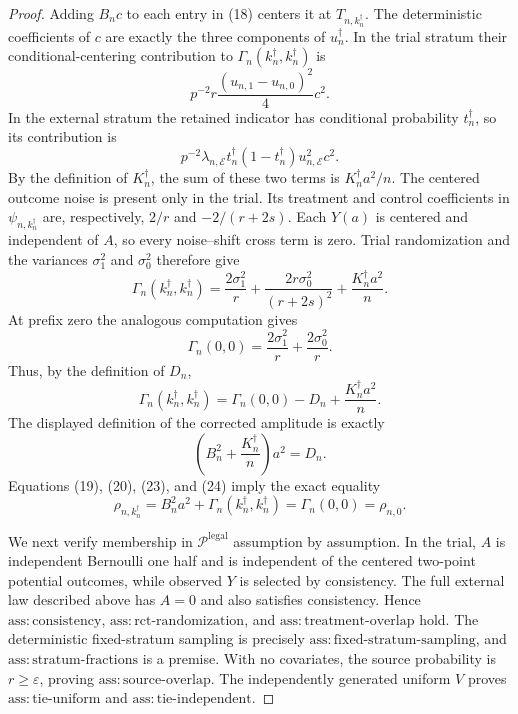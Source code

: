 \documentclass{article}
\begin{document}
\begin{proof}
Adding \(B_nc\) to each entry in (18) centers it at \(T_{n,k_n^{\dagger}}\).  The deterministic coefficients of \(c\) are exactly the three components of \(u_n^{\dagger}\).  In the trial stratum their conditional-centering contribution to \(\Gamma_n(k_n^{\dagger},k_n^{\dagger})\) is
\[
 p^{-2}r\frac{(u_{n,1}-u_{n,0})^2}{4}c^2.
\]
In the external stratum the retained indicator has conditional probability \(t_n^{\dagger}\), so its contribution is
\[
 p^{-2}\lambda_{n,\mathcal E}t_n^{\dagger}(1-t_n^{\dagger})u_{n,\mathcal E}^2c^2.
\]
By the definition of \(K_n^{\dagger}\), the sum of these two terms is \(K_n^{\dagger}a^2/n\).  The centered outcome noise is present only in the trial.  Its treatment and control coefficients in \(\psi_{n,k_n^{\dagger}}\) are, respectively, \(2/r\) and \(-2/(r+2s)\).  Each \(Y(a)\) is centered and independent of \(A\), so every noise--shift cross term is zero.  Trial randomization and the variances \(\sigma_1^2\) and \(\sigma_0^2\) therefore give
\[
 \Gamma_n(k_n^{\dagger},k_n^{\dagger})
 =\frac{2\sigma_1^2}{r}
  +\frac{2r\sigma_0^2}{(r+2s)^2}
  +\frac{K_n^{\dagger}a^2}{n}.
\tag{21}
\]
At prefix zero the analogous computation gives
\[
 \Gamma_n(0,0)=\frac{2\sigma_1^2}{r}+\frac{2\sigma_0^2}{r}.
\tag{22}
\]
Thus, by the definition of \(D_n\),
\[
 \Gamma_n(k_n^{\dagger},k_n^{\dagger})
 =\Gamma_n(0,0)-D_n+\frac{K_n^{\dagger}a^2}{n}.
\tag{23}
\]
The displayed definition of the corrected amplitude is exactly
\[
 \left(B_n^2+\frac{K_n^{\dagger}}n\right)a^2=D_n.
\tag{24}
\]
Equations (19), (20), (23), and (24) imply the exact equality
\[
 \rho_{n,k_n^{\dagger}}
 =B_n^2a^2+\Gamma_n(k_n^{\dagger},k_n^{\dagger})
 =\Gamma_n(0,0)
 =\rho_{n,0}.
\tag{25}
\]

We next verify membership in \(\mathcal P^{\mathrm{legal}}\) assumption by assumption.  In the trial, \(A\) is independent Bernoulli one half and is independent of the centered two-point potential outcomes, while observed \(Y\) is selected by consistency.  The full external law described above has \(A=0\) and also satisfies consistency.  Hence \(\mathrm{ass:consistency}\), \(\mathrm{ass:rct\text{-}randomization}\), and \(\mathrm{ass:treatment\text{-}overlap}\) hold.  The deterministic fixed-stratum sampling is precisely \(\mathrm{ass:fixed\text{-}stratum\text{-}sampling}\), and \(\mathrm{ass:stratum\text{-}fractions}\) is a premise.  With no covariates, the source probability is \(r\geq\varepsilon\), proving \(\mathrm{ass:source\text{-}overlap}\).  The independently generated uniform \(V\) proves \(\mathrm{ass:tie\text{-}uniform}\) and \(\mathrm{ass:tie\text{-}independent}\).


\end{proof}
\end{document}
